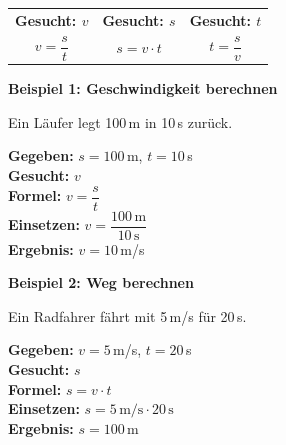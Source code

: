 \documentclass[11pt, a4paper]{article}
\newcommand{\abschnitt}[1]{%
    \vspace{6pt}%
    \noindent{\large\bfseries\textcolor{physik}{#1}}%
    \vspace{4pt}%
}
\begin{document}
\vspace{0.5em}

\begin{merkkasten}
\begin{center}
\begin{tabular}{ccc}
\textbf{Gesucht: $v$} & \textbf{Gesucht: $s$} & \textbf{Gesucht: $t$} \\[0.5em]
$v = \dfrac{s}{t}$ & $s = v \cdot t$ & $t = \dfrac{s}{v}$ \\
\end{tabular}
\end{center}
\end{merkkasten}

\vspace{0.5em}

\abschnitt{Beispielrechnungen}

\begin{minipage}[t]{0.48\textwidth}
\textbf{Beispiel 1: Geschwindigkeit berechnen}

Ein Läufer legt 100\,m in 10\,s zurück.

\textbf{Gegeben:} $s = 100$\,m, $t = 10$\,s\\
\textbf{Gesucht:} $v$\\
\textbf{Formel:} $v = \dfrac{s}{t}$\\
\textbf{Einsetzen:} $v = \dfrac{100\,\text{m}}{10\,\text{s}}$\\
\textbf{Ergebnis:} $v = 10$\,m/s
\end{minipage}
\hfill
\begin{minipage}[t]{0.48\textwidth}
\textbf{Beispiel 2: Weg berechnen}

Ein Radfahrer fährt mit 5\,m/s für 20\,s.

\textbf{Gegeben:} $v = 5$\,m/s, $t = 20$\,s\\
\textbf{Gesucht:} $s$\\
\textbf{Formel:} $s = v \cdot t$\\
\textbf{Einsetzen:} $s = 5\,\text{m/s} \cdot 20\,\text{s}$\\
\textbf{Ergebnis:} $s = 100$\,m
\end{minipage}

\vspace{0.8em}

\abschnitt{Typische Geschwindigkeiten}
\end{document}
